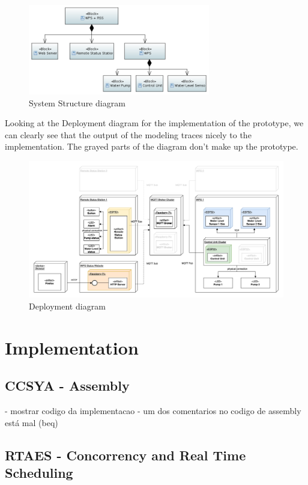 \documentclass[11pt]{article}
\begin{document}
\begin{figure}[H]
  \centering
  \includegraphics[width=300px]{../diagrams/system-structure.png}
  \caption{System Structure diagram}
  \label{fig:System Structure Diagram}
\end{figure}

Looking at the Deployment diagram for the implementation of the prototype, we can clearly see that the output of the modeling traces nicely to the implementation.
The grayed parts of the diagram don't make up the prototype. 

\begin{figure}[H]
  \centering
  \includegraphics[width=\linewidth]{../diagrams/deployment-diagram.jpg}
  \caption{Deployment diagram}
  \label{fig:Deployment Diagram}
\end{figure}

\newpage
\section{Implementation}

\subsection{CCSYA - Assembly}

- mostrar codigo da implementacao
- um dos comentarios no codigo de assembly está mal (beq)

\subsection{RTAES - Concorrency and Real Time Scheduling}
\end{document}

